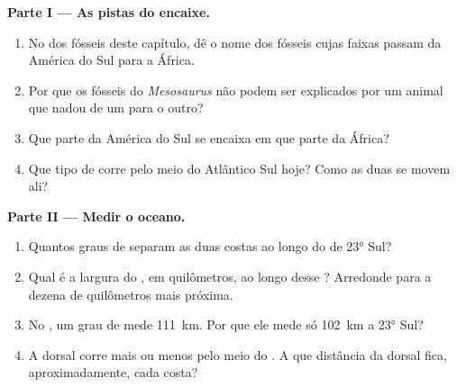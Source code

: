 \begin{problem}
\medskip
\noindent\textbf{Parte I --- As pistas do encaixe.}
\begin{enumerate}
  \item No  dos fósseis deste capítulo, dê o nome dos fósseis cujas
        faixas passam da América do Sul para a África.
  \item Por que os fósseis do \emph{Mesosaurus} não podem ser explicados
        por um animal que nadou de um  para o outro?
  \item Que parte da América do Sul se encaixa em que parte da África?
  \item Que tipo de  corre pelo meio do Atlântico Sul hoje?
        Como as duas  se movem ali?
\end{enumerate}

\medskip
\noindent\textbf{Parte II --- Medir o oceano.}
\begin{enumerate}[resume]
  \item Quantos graus de  separam as duas costas ao longo do
         de \ang{23} Sul?
  \item Qual é a largura do , em quilômetros, ao longo desse
        ? Arredonde para a dezena de quilômetros mais próxima.
  \item No , um grau de  mede \qty{111}{km}. Por que ele
        mede só \qty{102}{km} a \ang{23} Sul?
  \item A dorsal corre mais ou menos pelo meio do . A que distância
        da dorsal fica, aproximadamente, cada costa?
\end{enumerate}


\end{problem}
